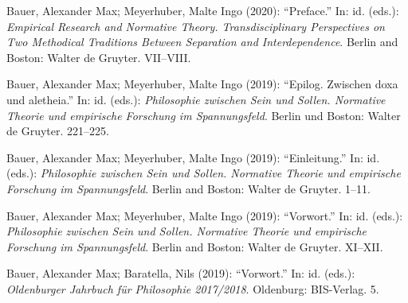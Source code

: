 \documentclass[a4paper,10pt]{article}
\newenvironment{literature}{%
   \parskip6pt\parindent0pt\raggedright
   \def\lititem{\hangindent=1cm\hangafter1}}{%
   \par\ignorespaces}
\begin{document}
\begin{literature}
\lititem Bauer, Alexander Max; Meyerhuber, Malte Ingo (2020): \enquote{Preface.} In: id. (eds.): \textit{Empirical Research and Normative Theory. Transdisciplinary Perspectives on Two Methodical Traditions Between Separation and Interdependence}. Berlin and Boston: Walter de Gruyter. VII--VIII.

\lititem Bauer, Alexander Max; Meyerhuber, Malte Ingo (2019): \enquote{Epilog. Zwischen doxa und aletheia.} In: id. (eds.): \textit{Philosophie zwischen Sein und Sollen. Normative Theorie und empirische Forschung im Spannungsfeld}. Berlin und Boston: Walter de Gruyter. 221--225.

\lititem Bauer, Alexander Max; Meyerhuber, Malte Ingo (2019): \enquote{Einleitung.} In: id. (eds.): \textit{Philosophie zwischen Sein und Sollen. Normative Theorie und empirische Forschung im Spannungsfeld}. Berlin and Boston: Walter de Gruyter. 1--11.

\lititem Bauer, Alexander Max; Meyerhuber, Malte Ingo (2019): \enquote{Vorwort.} In: id. (eds.): \textit{Philosophie zwischen Sein und Sollen. Normative Theorie und empirische Forschung im Spannungsfeld}. Berlin and Boston: Walter de Gruyter. XI--XII.

\lititem Bauer, Alexander Max; Baratella, Nils (2019): \enquote{Vorwort.} In: id. (eds.): \textit{Oldenburger Jahrbuch für Philosophie 2017/2018}. Oldenburg: BIS-Verlag. 5.
\end{literature}


\end{document}
